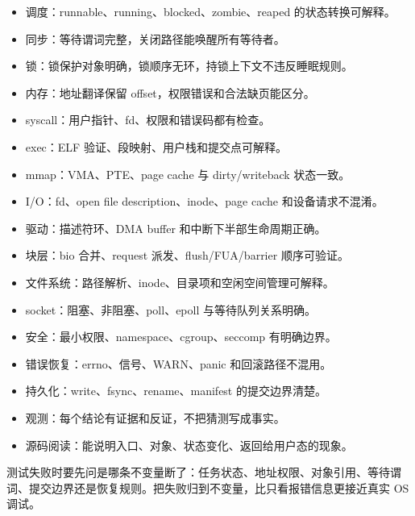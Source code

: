 \begin{rubricbox}
\begin{itemize}
\tightlist
\item 调度：runnable、running、blocked、zombie、reaped 的状态转换可解释。
\item 同步：等待谓词完整，关闭路径能唤醒所有等待者。
\item 锁：锁保护对象明确，锁顺序无环，持锁上下文不违反睡眠规则。
\item 内存：地址翻译保留 offset，权限错误和合法缺页能区分。
\item syscall：用户指针、fd、权限和错误码都有检查。
\item exec：ELF 验证、段映射、用户栈和提交点可解释。
\item mmap：VMA、PTE、page cache 与 dirty/writeback 状态一致。
\item I/O：fd、open file description、inode、page cache 和设备请求不混淆。
\item 驱动：描述符环、DMA buffer 和中断下半部生命周期正确。
\item 块层：bio 合并、request 派发、flush/FUA/barrier 顺序可验证。
\item 文件系统：路径解析、inode、目录项和空闲空间管理可解释。
\item socket：阻塞、非阻塞、poll、epoll 与等待队列关系明确。
\item 安全：最小权限、namespace、cgroup、seccomp 有明确边界。
\item 错误恢复：errno、信号、WARN、panic 和回滚路径不混用。
\item 持久化：write、fsync、rename、manifest 的提交边界清楚。
\item 观测：每个结论有证据和反证，不把猜测写成事实。
\item 源码阅读：能说明入口、对象、状态变化、返回给用户态的现象。
\end{itemize}
\end{rubricbox}

测试失败时要先问是哪条不变量断了：任务状态、地址权限、对象引用、等待谓词、提交边界还是恢复规则。把失败归到不变量，比只看报错信息更接近真实 OS 调试。
